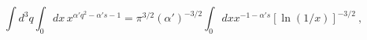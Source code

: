 \begin{equation}
\int d^3 q \int_0 dx \,x^{\alpha' q^2 - \alpha' s - 1} = \pi^{3/2}
(\alpha')^{-3/2} \int_0 dx  x^{-1-\alpha' s} [\ln (1/x)]^{-3/2}\ ,
\end{equation}

